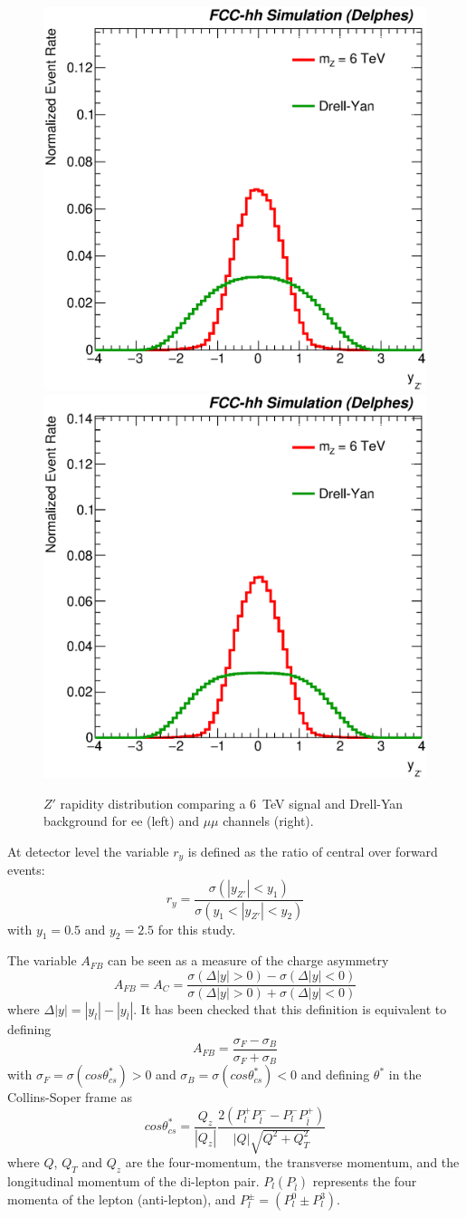 \begin{figure}[!htb]
  \centering
  \includegraphics[width=0.45\columnwidth]{Fig/27tev/yzp_sel0_lin_norm_ee.eps}
  \includegraphics[width=0.45\columnwidth]{Fig/27tev/yzp_sel0_lin_norm_mumu.eps}
  \caption{$Z'$ rapidity distribution comparing a 6~TeV signal and Drell-Yan background for ee (left) and $\mu\mu$ channels (right).}
  \label{figure:lepana:yzp}
\end{figure}

At detector level the variable $r_y$ is defined as the ratio of central over forward events:
\begin{equation}
r_y = \frac{\sigma(|y_{Z'}| < y_1)}{\sigma(y_1 < |y_{Z'}| <y_2)}
\end{equation}
with $y_1=0.5$ and $y_2=2.5$ for this study.

The variable $A_{FB}$ can be seen as a measure of the charge asymmetry
\begin{equation}
A_{FB} = A_C =  \frac{\sigma(\Delta|y| > 0) - \sigma(\Delta|y| < 0)}{\sigma(\Delta|y| > 0) + \sigma(\Delta|y| < 0)}
\end{equation}
where $\Delta|y| = |y_l| - |y_{\bar{l}}|$. It has been checked that this definition is equivalent to defining 
\begin{equation}
A_{FB} =   \frac{\sigma_F - \sigma_B}{\sigma_F + \sigma_B}
\end{equation}
with $\sigma_F = \sigma (cos\theta^{*}_{cs})>0$ and $\sigma_B = \sigma (cos\theta^{*}_{cs})<0$ and defining $\theta^*$ in the Collins-Soper 
frame as
\begin{equation}
cos\theta^{*}_{cs} =  \frac{Q_z}{|Q_z|} \frac{2(P_l^+P_{\bar{l}}^- - P_l^-P_{\bar{l}}^+)}{|Q| \sqrt{Q^2+Q^2_T}}
\end{equation}
where $Q$, $Q_T$ and $Q_z$ are the four-momentum, the transverse momentum, and the longitudinal
momentum of the di-lepton pair. $P_{l}(P_{\bar{l}})$ represents the four momenta of the lepton (anti-lepton),
and $P^\pm_l = (P^0_l \pm P^3_l)$.


